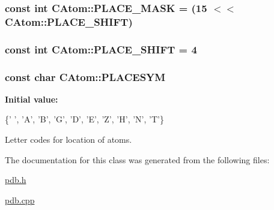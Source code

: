 \hypertarget{classCAtom_a03572c4dc279704a994647c54249a1f6}{
\subsubsection[{P\-L\-A\-C\-E\-\_\-\-M\-A\-S\-K}]{\setlength{\rightskip}{0pt plus 5cm}const int C\-Atom\-::\-P\-L\-A\-C\-E\-\_\-\-M\-A\-S\-K = (15 $<$$<${\bf C\-Atom\-::\-P\-L\-A\-C\-E\-\_\-\-S\-H\-I\-F\-T})\hspace{0.3cm}{\ttfamily [static]}}}\label{classCAtom_a03572c4dc279704a994647c54249a1f6}
\hypertarget{classCAtom_a86677e582ce1bbdd16d6af1807804aa0}{
\subsubsection[{P\-L\-A\-C\-E\-\_\-\-S\-H\-I\-F\-T}]{\setlength{\rightskip}{0pt plus 5cm}const int C\-Atom\-::\-P\-L\-A\-C\-E\-\_\-\-S\-H\-I\-F\-T = 4\hspace{0.3cm}{\ttfamily [static]}}}\label{classCAtom_a86677e582ce1bbdd16d6af1807804aa0}
\hypertarget{classCAtom_af438732d59641738cfea16a7dd895dea}{
\subsubsection[{P\-L\-A\-C\-E\-S\-Y\-M}]{\setlength{\rightskip}{0pt plus 5cm}const char C\-Atom\-::\-P\-L\-A\-C\-E\-S\-Y\-M\hspace{0.3cm}{\ttfamily [static]}}}\label{classCAtom_af438732d59641738cfea16a7dd895dea}
{\bfseries Initial value\-:}
\begin{DoxyCode}
 \{\textcolor{charliteral}{' '}, \textcolor{charliteral}{'A'}, \textcolor{charliteral}{'B'}, \textcolor{charliteral}{'G'}, \textcolor{charliteral}{'D'}, \textcolor{charliteral}{'E'}, 
                         \textcolor{charliteral}{'Z'}, \textcolor{charliteral}{'H'}, \textcolor{charliteral}{'N'}, \textcolor{charliteral}{'T'}\}
\end{DoxyCode}


Letter codes for location of atoms. 



The documentation for this class was generated from the following files\-:\begin{DoxyCompactItemize}
\item 
\hyperlink{pdb_8h}{pdb.\-h}\item 
\hyperlink{pdb_8cpp}{pdb.\-cpp}\end{DoxyCompactItemize}

